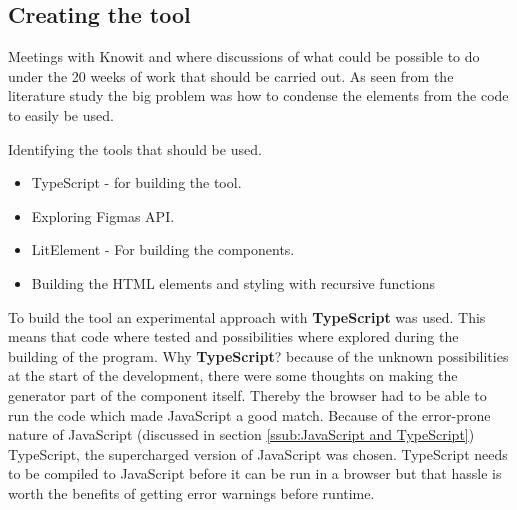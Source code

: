 


\subsection{Creating the tool}%
\label{sub:}


Meetings with Knowit and where discussions of what could be possible to do under the 20 weeks of work that should be carried out. As seen from the literature study the big problem was how to condense the elements from the code to easily be used. 

Identifying the tools that should be used.
\begin{itemize}
  \item TypeScript - for building the tool.
  \item Exploring Figmas API.
  \item LitElement - For building the components. 
  \item Building the HTML elements and styling with recursive functions
\end{itemize}

To build the tool an experimental approach with \textbf{TypeScript} was used. This means that code where tested and possibilities where explored during the building of the program. Why \textbf{TypeScript}? because of the unknown possibilities at the start of the development, there were some thoughts on making the generator part of the component itself. Thereby the browser had to be able to run the code which made JavaScript a good match. Because of the error-prone nature of JavaScript (discussed in section \ref{ssub:JavaScript and TypeScript}) TypeScript, the supercharged version of JavaScript was chosen. TypeScript needs to be compiled to JavaScript before it can be run in a browser but that hassle is worth the benefits of getting error warnings before runtime.

